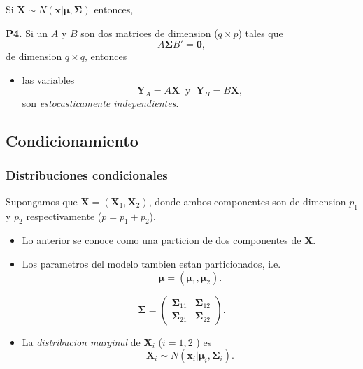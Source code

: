 \documentclass[11pt,]{article}
\providecommand{\tightlist}{%
\setlength{\itemsep}{0pt}\setlength{\parskip}{0pt}}
\begin{document}
Si
\(\boldsymbol{X} \sim N(\boldsymbol{x}|\boldsymbol{\mu},\boldsymbol{\Sigma})\)
entonces,

\textbf{P4.} Si un \(A\) y \(B\) son dos matrices de dimension
(\(q\times p\)) tales que \[
A\boldsymbol{\Sigma}B' = \boldsymbol{0},
\] de dimension \(q\times q\), entonces

\begin{itemize}
\tightlist
\item
  las variables \[
  \boldsymbol{Y}_A = A\boldsymbol{X} \ \text{ y } \
  \boldsymbol{Y}_B = B\boldsymbol{X},
  \] son \emph{estocasticamente independientes}.
\end{itemize}

\subsection{Condicionamiento}\label{condicionamiento}

\subsubsection{Distribuciones
condicionales}\label{distribuciones-condicionales}

Supongamos que \(\boldsymbol{X}=(\boldsymbol{X}_1,\boldsymbol{X}_2)\),
donde ambos componentes son de dimension \(p_1\) y \(p_2\)
respectivamente (\(p=p_1+p_2\)).

\begin{itemize}
\item
  Lo anterior se conoce como una particion de dos componentes de
  \(\boldsymbol{X}\).
\item
  Los parametros del modelo tambien estan particionados, i.e. \[
  \boldsymbol{\mu} = (\boldsymbol{\mu}_1,\boldsymbol{\mu}_2).
  \]
\end{itemize}

\[
\boldsymbol{\Sigma} = 
\left(
\begin{array}{cc}
\boldsymbol{\Sigma}_{11} & \boldsymbol{\Sigma}_{12} \\
\boldsymbol{\Sigma}_{21} & \boldsymbol{\Sigma}_{22}
\end{array}
\right).
\]

\begin{itemize}
\tightlist
\item
  La \emph{distribucion marginal} de \(\boldsymbol{X}_i\) (\(i=1,2\) )
  es \[
  \boldsymbol{X}_i \sim N(\boldsymbol{x}_i|\boldsymbol{\mu}_i,\boldsymbol{\Sigma}_i).
  \]
\end{itemize}
\end{document}
